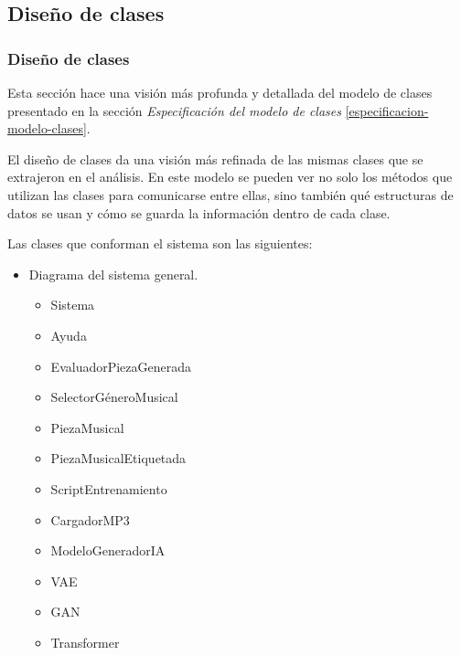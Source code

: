 
\subsection{Diseño de clases}
\label{diseño-clases}
\subsubsection{Diseño de clases}

Esta sección hace una visión más profunda y detallada del modelo de clases presentado en la sección \emph{Especificación del modelo de clases} \ref{especificacion-modelo-clases}.

El diseño de clases da una visión más refinada de las mismas clases que se extrajeron en el análisis. En este modelo se pueden ver no solo los métodos que utilizan las clases para comunicarse entre ellas, sino también qué estructuras de datos se usan y cómo se guarda la información dentro de cada clase.

Las clases que conforman el sistema son las siguientes:

\begin{itemize}
    \item Diagrama del sistema general.
    \begin{itemize}
        \item Sistema
        \item Ayuda
        \item EvaluadorPiezaGenerada
        \item SelectorGéneroMusical
        \item PiezaMusical
        \item PiezaMusicalEtiquetada
        \item ScriptEntrenamiento
        \item CargadorMP3
        \item ModeloGeneradorIA
        \item VAE
        \item GAN
        \item Transformer
    \end{itemize}
\end{itemize}

